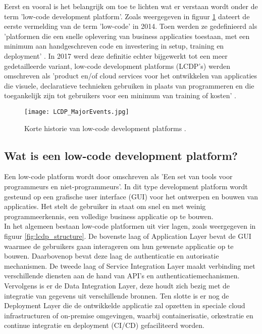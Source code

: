 Eerst en vooral is het belangrijk om toe te lichten wat er verstaan wordt onder de term 'low-code development platform'. Zoals weergegeven in figuur \ref{fig:lcdp_history} dateert de eerste vermelding van de term 'low-code' in 2014. Toen werden ze gedefinieerd als 'platformen die een snelle oplevering van business applicaties toestaan, met een minimum aan handgeschreven code en investering in setup, training en deployment' \autocite{Ruscio2022}. In 2017 werd deze definitie echter bijgewerkt tot een meer gedetailleerde variant, low-code development platforms (LCDP's) werden omschreven als 'product en/of cloud services voor het ontwikkelen van applicaties die visuele, declaratieve technieken gebruiken in plaats van programmeren en die toegankelijk zijn tot gebruikers voor een minimum van training of kosten' \autocite{Ruscio2022}. \\

\begin{figure}[h]
    \centering
    \texttt{[image: LCDP\_MajorEvents.jpg]}
    \caption[Geschiedenis low-code development platforms]{Korte historie van low-code development platforms \autocite{Ruscio2022}.}
    \label{fig:lcdp_history}
\end{figure}

\subsection{Wat is een low-code development platform?}
\label{subsec:what_is_low_code}

Een low-code platform wordt door \textcite{Waszkowski2019} omschreven als 'Een set van tools voor programmeurs en niet-programmeurs'. In dit type development platform wordt gesteund op een grafische user interface (GUI) voor het ontwerpen en bouwen van applicaties. Het stelt de gebruiker in staat om snel en met weinig programmeerkennis, een volledige business applicatie op te bouwen. \\

In het algemeen bestaan low-code platformen uit vier lagen, zoals weergegeven in figuur \ref{fig:lcdp_structure}. De bovenste laag of Application Layer bevat de GUI waarmee de gebruikers gaan interageren om hun gewenste applicatie op te bouwen. Daarbovenop bevat deze laag de authenticatie en autorisatie mechanismen. De tweede laag of Service Integration Layer maakt verbinding met verschillende diensten aan de hand van API's en authenticatiemechanismen. Vervolgens is er de Data Integration Layer, deze houdt zich bezig met de integratie van gegevens uit verschillende bronnen. Ten slotte is er nog de Deployment Layer die de ontwikkelde applicatie zal opzetten in speciale cloud infrastructuren of on-premise omgevingen, waarbij containerisatie, orkestratie en continue integratie en deployment (CI/CD) gefaciliteerd worden. \\

